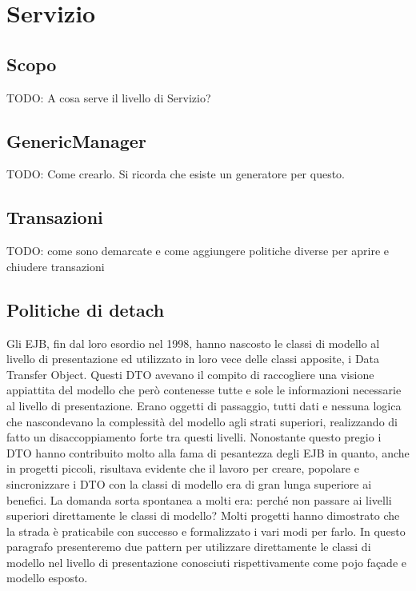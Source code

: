 \chapter{Servizio}

\section{Scopo}
TODO: A cosa serve il livello di Servizio?

\section{GenericManager}
TODO: Come crearlo. Si ricorda che esiste un generatore per questo.

\section{Transazioni}
TODO: come sono demarcate e come aggiungere politiche diverse per aprire e chiudere transazioni

\section{Politiche di detach}
Gli EJB, fin dal loro esordio nel 1998, hanno nascosto le classi di modello al livello di presentazione ed utilizzato in loro vece delle classi apposite, i Data Transfer Object. Questi DTO avevano il compito di raccogliere una visione appiattita del modello che però contenesse tutte e sole le informazioni necessarie al livello di presentazione. Erano oggetti di passaggio, tutti dati e nessuna logica che nascondevano la complessità del modello agli strati superiori, realizzando di fatto un disaccoppiamento forte tra questi livelli. 
Nonostante questo pregio i DTO hanno contribuito molto alla fama di pesantezza degli EJB in quanto, anche in progetti piccoli, risultava evidente che il lavoro per creare, popolare e sincronizzare i DTO con la classi di modello era di gran lunga superiore ai benefici. La domanda sorta spontanea a molti era: perché non passare ai livelli superiori direttamente le classi di modello? Molti progetti hanno dimostrato che la strada è praticabile con successo e formalizzato i vari modi per farlo.
In questo paragrafo presenteremo due pattern per utilizzare direttamente le classi di modello nel livello di presentazione conosciuti rispettivamente come pojo façade e modello  esposto.


